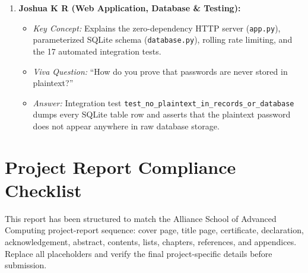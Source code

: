 \documentclass[12pt,a4paper,oneside]{report}
\begin{document}
\begin{enumerate}
  \item \textbf{Joshua K R (Web Application, Database \& Testing):}
  \begin{itemize}
    \item \emph{Key Concept:} Explains the zero-dependency HTTP server (\texttt{app.py}), parameterized SQLite schema (\texttt{database.py}), rolling rate limiting, and the 17 automated integration tests.
    \item \emph{Viva Question:} ``How do you prove that passwords are never stored in plaintext?''
    \item \emph{Answer:} Integration test \texttt{test\_no\_plaintext\_in\_records\_or\_database} dumps every SQLite table row and asserts that the plaintext password does not appear anywhere in raw database storage.
  \end{itemize}
\end{enumerate}

\chapter{Project Report Compliance Checklist}
\label{app:checklist}
This report has been structured to match the Alliance School of Advanced Computing project-report sequence: cover page, title page, certificate, declaration, acknowledgement, abstract, contents, lists, chapters, references, and appendices. Replace all placeholders and verify the final project-specific details before submission.
\end{document}
